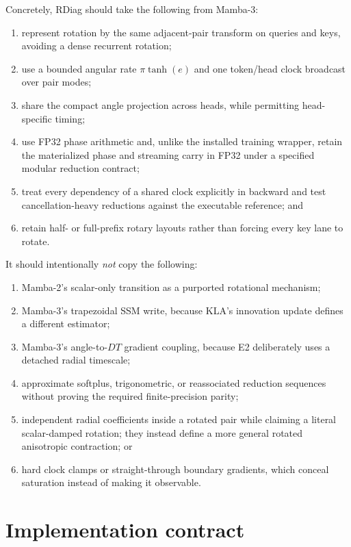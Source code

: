 \documentclass[11pt]{article}
\begin{document}
Concretely, RDiag should take the following from Mamba-3:
\begin{enumerate}[leftmargin=1.8em]
  \item represent rotation by the same adjacent-pair transform on queries and keys, avoiding a
        dense recurrent rotation;
  \item use a bounded angular rate $\pi\tanh(e)$ and one token/head clock broadcast over pair modes;
  \item share the compact angle projection across heads, while permitting head-specific timing;
  \item use FP32 phase arithmetic and, unlike the installed training wrapper, retain the
        materialized phase and streaming carry in FP32 under a specified modular reduction
        contract;
  \item treat every dependency of a shared clock explicitly in backward and test cancellation-heavy
        reductions against the executable reference; and
  \item retain half- or full-prefix rotary layouts rather than forcing every key lane to rotate.
\end{enumerate}

It should intentionally \emph{not} copy the following:
\begin{enumerate}[leftmargin=1.8em]
  \item Mamba-2's scalar-only transition as a purported rotational mechanism;
  \item Mamba-3's trapezoidal SSM write, because KLA's innovation update defines a different
        estimator;
  \item Mamba-3's angle-to-$DT$ gradient coupling, because E2 deliberately uses a detached radial
        timescale;
  \item approximate softplus, trigonometric, or reassociated reduction sequences without proving
        the required finite-precision parity;
  \item independent radial coefficients inside a rotated pair while claiming a literal
        scalar-damped rotation; they instead define a more general rotated anisotropic
        contraction; or
  \item hard clock clamps or straight-through boundary gradients, which conceal saturation instead
        of making it observable.
\end{enumerate}

\section{Implementation contract}
\label{sec:implementation}
\end{document}
